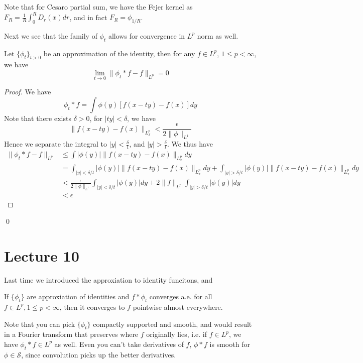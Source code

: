 \begin{remark}
    Note that for Cesaro partial sum, we have the Fejer kernel as $F_R=\frac{1}{R}\int_0^R D_r(x)dr$, and in fact $F_R=\phi_{1/R}$.
\end{remark}
Next we see that the family of $\phi_t$ allows for convergence in $L^p$ norm as well.
\begin{theorem}
    Let $\{\phi_t\}_{t>0}$ be an approximation of the identity, then for any $f\in L^p$, $1\leq p<\infty$, we have
    \begin{equation*}
        \lim_{t\to 0}\|\phi_t\ast f-f\|_{L^p}=0
    \end{equation*}
\end{theorem}
\begin{proof}
    We have
    \begin{equation*}
        \phi_t\ast f=\int\phi(y)[f(x-ty)-f(x)]dy
    \end{equation*}
    Note that there exists $\delta>0$, for $|ty|<\delta$, we have
    \begin{equation*}
        \|f(x-ty)-f(x)\|_{L_x^p}<\frac{\epsilon}{2\|\phi\|_{L^1}}
    \end{equation*}
    Hence we separate the integral to $|y|<\frac{\delta}{t}$, and $|y|>\frac{\delta}{t}$. We thus have
    \begin{align*}
        \|\phi_t\ast f-f\|_{L^p}&\leq \int|\phi(y)|\|f(x-ty)-f(x)\|_{L_x^p}dy\\
        &=\int_{|y|<\delta/t}|\phi(y)|\|f(x-ty)-f(x)\|_{L_x^p}dy+\int_{|y|>\delta/t}|\phi(y)|\|f(x-ty)-f(x)\|_{L_x^p}dy\\
        &<\frac{\epsilon}{2\|\phi\|_{L^1}}\int_{|y|<\delta/t}|\phi(y)|dy+2\|f\|_{L^p}\int_{|y|>\delta/t}|\phi(y)|dy\\
        &<\epsilon
    \end{align*}
\end{proof}
\qed




\section{Lecture 10}
Last time we introduced the approxiation to identity funcitons, and 
\begin{exercise}
    If $\{\phi_t\}$ are approxiation of identities and $f\ast \phi_t$ converges a.e. for all $f\in L^p, 1\leq p<\infty$, then it converges to $f$ pointwise almost everywhere.
\end{exercise}
\begin{remark}
    Note that you can pick $\{\phi_t\}$ compactly supported and smooth, and would result in a Fourier transform that preserves where $f$ originally lies, i.e. if $f\in L^p$, we have $\phi_t\ast f\in L^p$ as well. Even you can't take derivatives of $f$, $\phi\ast f$ is smooth for $\phi\in\mathcal{S}$, since convolution picks up the better derivatives.
\end{remark}

